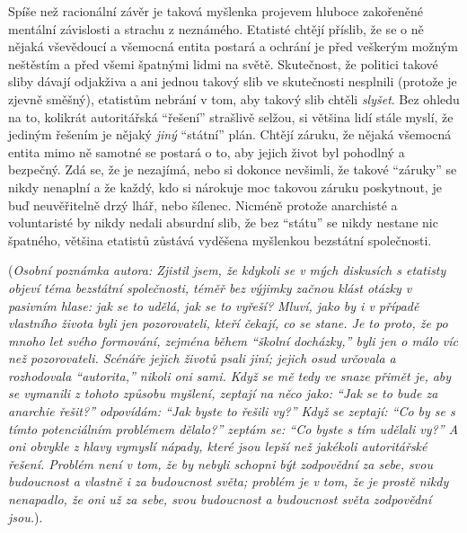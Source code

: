\documentclass{book}
\begin{document}
Spíše než racionální závěr je taková myšlenka projevem hluboce zakořeněné mentální závislosti a strachu z neznámého. Etatisté chtějí příslib, že se o ně nějaká vševědoucí a všemocná entita postará a ochrání je před veškerým možným neštěstím a před všemi špatnými lidmi na světě. Skutečnost, že politici takové sliby dávají odjakživa a ani jednou takový slib ve skutečnosti nesplnili (protože je zjevně směšný), etatistům nebrání v tom, aby takový slib chtěli \emph{slyšet}. Bez ohledu na to, kolikrát autoritářská \enquote{řešení} strašlivě selžou, si většina lidí stále myslí, že jediným řešením je nějaký \emph{jiný} \enquote{státní} plán. Chtějí záruku, že nějaká všemocná entita mimo ně samotné se postará o to, aby jejich život byl pohodlný a bezpečný. Zdá se, že je nezajímá, nebo si dokonce nevšimli, že takové \enquote{záruky} se nikdy nenaplní a že každý, kdo si nárokuje moc takovou záruku poskytnout, je buď neuvěřitelně drzý lhář, nebo šílenec. Nicméně protože anarchisté a voluntaristé by nikdy nedali absurdní slib, že bez \enquote{státu} se nikdy nestane nic špatného, většina etatistů zůstává vyděšena myšlenkou bezstátní společnosti.

(\emph{Osobní poznámka autora: Zjistil jsem, že kdykoli se v mých diskusích s etatisty objeví téma bezstátní společnosti, téměř bez výjimky začnou klást otázky v pasivním hlase: jak se to udělá, jak se to vyřeší? Mluví, jako by i v případě vlastního života byli jen pozorovateli, kteří čekají, co se stane. Je to proto, že po mnoho let svého formování, zejména během \enquote{školní docházky,} byli jen o málo víc než pozorovateli. Scénáře jejich životů psali jiní; jejich osud určovala a rozhodovala \enquote{autorita,} nikoli oni sami. Když se mě tedy ve snaze přimět je, aby se vymanili z tohoto způsobu myšlení, zeptají na něco jako: \enquote{Jak se to bude za anarchie řešit?} odpovídám: \enquote{Jak byste to řešili vy?} Když se zeptají: \enquote{Co by se s tímto potenciálním problémem dělalo?} zeptám se: \enquote{Co byste s tím udělali vy?} A oni obvykle z hlavy vymyslí nápady, které jsou lepší než jakékoli autoritářské řešení. Problém není v tom, že by nebyli schopni být zodpovědní za sebe, svou budoucnost a vlastně i za budoucnost světa; problém je v tom, že je prostě nikdy nenapadlo, že oni už za sebe, svou budoucnost a budoucnost světa zodpovědní jsou.}).
\end{document}

